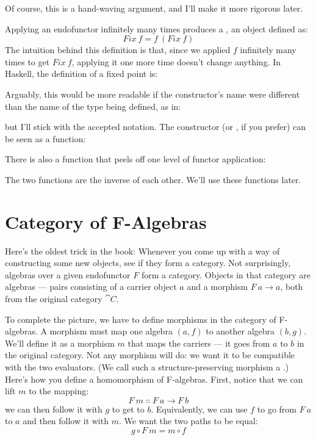 Of course, this is a hand-waving argument, and I'll make it more
rigorous later.

Applying an endofunctor infinitely many times produces a , an object defined as:
\[Fix\ f = f\ (Fix\ f)\]
The intuition behind this definition is that, since we applied
$f$ infinitely many times to get $Fix\ f$, applying it one
more time doesn't change anything. In Haskell, the definition of a fixed
point is:

Arguably, this would be more readable if the constructor's name were
different than the name of the type being defined, as in:

but I'll stick with the accepted notation. The constructor 
(or , if you prefer) can be seen as a function:

There is also a function that peels off one level of functor
application:

The two functions are the inverse of each other. We'll use these
functions later.

\section{Category of F-Algebras}

Here's the oldest trick in the book: Whenever you come up with a way of
constructing some new objects, see if they form a category. Not
surprisingly, algebras over a given endofunctor $F$ form a
category. Objects in that category are algebras --- pairs consisting of
a carrier object $a$ and a morphism
$F\ a \to a$, both from the original category
$\cat{C}$.

To complete the picture, we have to define morphisms in the category of
F-algebras. A morphism must map one algebra $(a, f)$ to another
algebra $(b, g)$. We'll define it as a morphism $m$ that
maps the carriers --- it goes from $a$ to $b$ in the
original category. Not any morphism will do: we want it to be compatible
with the two evaluators. (We call such a structure-preserving morphism a
.) Here's how you define a homomorphism of
F-algebras. First, notice that we can lift $m$ to the mapping:
\[F\ m \Colon F\ a \to F\ b\]
we can then follow it with $g$ to get to $b$.
Equivalently, we can use $f$ to go from $F\ a$ to
$a$ and then follow it with $m$. We want the two paths to
be equal:
\[g \circ F\ m = m \circ f\]

